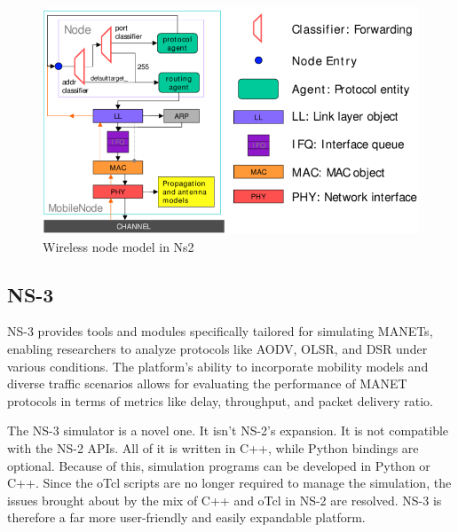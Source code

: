 \documentclass[]{nsm-thesis}
\begin{document}
\begin{figure}[h]
\graphicspath{{/image/}} %
\centering
\includegraphics[scale=0.4]{image/Node Modell Ns-2.png} %
\caption{Wireless node model in Ns2 \cite{al2018performance}}
\label{fig:mesh5} %
\end{figure}



\subsection{NS-3}
NS-3 provides tools and modules specifically tailored for simulating MANETs, enabling researchers to analyze protocols like AODV, OLSR, and DSR under various conditions. The platform’s ability to incorporate mobility models and diverse traffic scenarios allows for evaluating the performance of MANET protocols in terms of metrics like delay, throughput, and packet delivery ratio.

The NS-3 simulator is a novel one. It isn't NS-2's expansion. It is not compatible with the NS-2 APIs. All of it is written in C++, while Python bindings are optional. Because of this, simulation programs can be developed in Python or C++. Since the oTcl scripts are no longer required to manage the simulation, the issues brought about by the mix of C++ and oTcl in NS-2 are resolved. NS-3 is therefore a far more user-friendly and easily expandable platform. 
\end{document}
